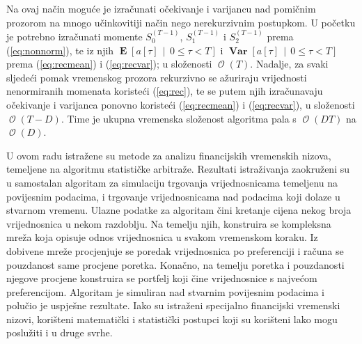 \documentclass[lmodern, utf8, diplomski, numeric]{fer}
\newcommand{\Efromto}[2]{\operatorname{\mathbf{E}}\q[#1\, \middle\vert\, #2\w]}
\newcommand{\Varfromto}[2]{\operatorname{\mathbf{Var}}\q[#1\, \middle\vert\, #2\w]}
\newcommand{\bigO}[1]{\operatorname{\mathcal{O}}\q(#1\w)}
\newcommand{\q}{\left}
\newcommand{\w}{\right}
\begin{document}
  Na ovaj način moguće je izračunati očekivanje i varijancu nad pomičnim prozorom na mnogo učinkovitiji način nego nerekurzivnim postupkom.
  U početku je potrebno izračunati momente $S_0^{(T - 1)}$, $S_1^{(T - 1)} $ i $S_2^{(T - 1)}$ prema (\ref{eq:nonnorm}), te iz njih $\Efromto{a\q[\tau\w]}{0 \le \tau < T}$ i $\Varfromto{a\q[\tau\w]}{0 \le \tau < T}$ prema (\ref{eq:recmean}) i (\ref{eq:recvar}); u složenosti $\bigO{T}$.
  Nadalje, za svaki sljedeći pomak vremenskog prozora rekurzivno se ažuriraju vrijednosti nenormiranih momenata koristeći (\ref{eq:rec}), te se putem njih izračunavaju očekivanje i varijanca ponovno koristeći (\ref{eq:recmean}) i (\ref{eq:recvar}), u složenosti $\bigO{T - D}$.
  Time je ukupna vremenska složenost algoritma pala s $\bigO{DT}$ na $\bigO{D}$.

  \begin{sazetak}
  U ovom radu istražene su metode za analizu financijskih vremenskih nizova, temeljene na algoritmu statističke arbitraže.
  Rezultati istraživanja zaokruženi su u samostalan algoritam za simulaciju trgovanja vrijednosnicama temeljenu na povijesnim podacima, i trgovanje vrijednosnicama nad podacima koji dolaze u stvarnom vremenu.
  Ulazne podatke za algoritam čini kretanje cijena nekog broja vrijednosnica u nekom razdoblju.
  Na temelju njih, konstruira se kompleksna mreža koja opisuje odnos vrijednosnica u svakom vremenskom koraku.
  Iz dobivene mreže procjenjuje se poredak vrijednosnica po preferenciji i računa se pouzdanost same procjene poretka.
  Konačno, na temelju poretka i pouzdanosti njegove procjene konstruira se portfelj koji čine vrijednosnice s najvećom preferencijom.
  Algoritam je simuliran nad stvarnim povijesnim podacima i polučio je uspješne rezultate.
  Iako su istraženi specijalno financijski vremenski nizovi, korišteni matematički i statistički postupci koji su korišteni lako mogu poslužiti i u druge svrhe.

  \end{sazetak}
  \pagebreak
\end{document}

